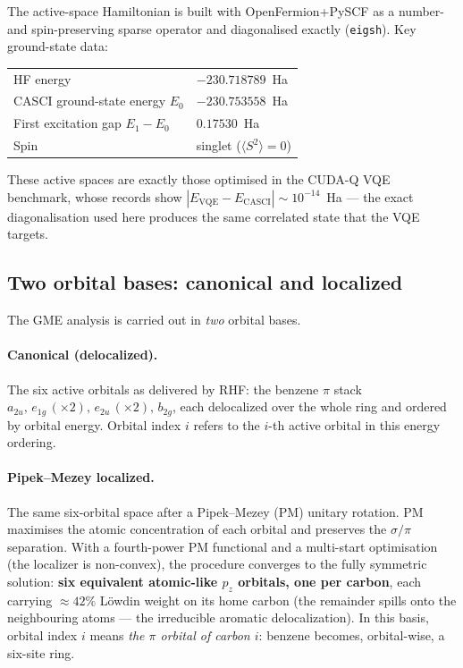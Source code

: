 \documentclass[11pt]{article}
\newcommand{\code}[1]{\texttt{\small #1}}
\begin{document}
The active-space Hamiltonian is built with OpenFermion+PySCF as a number- and
spin-preserving sparse operator and diagonalised exactly (\code{eigsh}). Key
ground-state data:
\begin{center}
\begin{tabular}{@{}ll@{}}
\toprule
HF energy                    & $-230.718789$~Ha \\
CASCI ground-state energy $E_0$ & $-230.753558$~Ha \\
First excitation gap $E_1-E_0$  & $0.17530$~Ha \\
Spin                         & singlet ($\langle S^2\rangle=0$) \\
\bottomrule
\end{tabular}
\end{center}
These active spaces are exactly those optimised in the CUDA-Q VQE benchmark,
whose records show $|E_{\mathrm{VQE}}-E_{\mathrm{CASCI}}|\sim10^{-14}$~Ha ---
the exact diagonalisation used here produces the same correlated state that the
VQE targets.

\subsection{Two orbital bases: canonical and localized}\label{sec:bases}
The GME analysis is carried out in \emph{two} orbital bases.

\paragraph{Canonical (delocalized).}
The six active orbitals as delivered by RHF: the benzene $\pi$ stack
$a_{2u},\,e_{1g}\,(\times2),\,e_{2u}\,(\times2),\,b_{2g}$, each delocalized over
the whole ring and ordered by orbital energy. Orbital index $i$ refers to the
$i$-th active orbital in this energy ordering.

\paragraph{Pipek--Mezey localized.}
The same six-orbital space after a Pipek--Mezey (PM) unitary rotation. PM
maximises the atomic concentration of each orbital and preserves the
$\sigma/\pi$ separation. With a fourth-power PM functional and a multi-start
optimisation (the localizer is non-convex), the procedure converges to the
fully symmetric solution: \textbf{six equivalent atomic-like $p_z$ orbitals,
one per carbon}, each carrying $\approx42\%$ L\"owdin weight on its home carbon
(the remainder spills onto the neighbouring atoms --- the irreducible aromatic
delocalization). In this basis, orbital index $i$ means \emph{the $\pi$ orbital
of carbon $i$}: benzene becomes, orbital-wise, a six-site ring.
\end{document}
